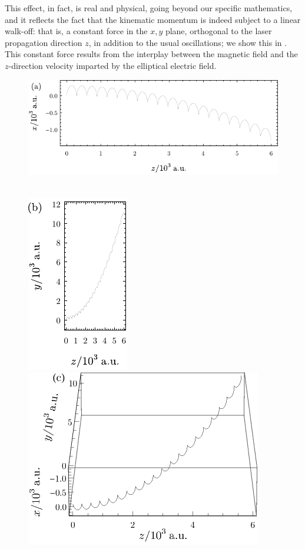 This effect, in fact, is real and physical, going beyond our specific mathematics, and it reflects the fact that the kinematic momentum is indeed subject to a linear walk-off: that is, a constant force in the $x,y$ plane, orthogonal to the laser propagation direction $z$, in addition to the usual oscillations; we show this in . This constant force results from the interplay between the magnetic field and the $z$-direction velocity imparted by the elliptical electric field.



\begin{figure}[htb]
  \centering
  
  \subfloat{\label{f9-trajectory-xz}}
  \includegraphics[scale=1]{9-Nondipole-HHG/Figures/figure9Da.pdf}
  \hspace{9mm}$\,$
  
  \vspace{5mm}
  
  \subfloat{\label{f9-trajectory-yz}}
  \includegraphics[scale=1]{9-Nondipole-HHG/Figures/figure9Db.pdf} 
  \hspace{5mm}
  \subfloat{\label{f9-trajectory-3d}}
  \includegraphics[scale=1]{9-Nondipole-HHG/Figures/figure9Dc.pdf} 
  

\end{figure}

